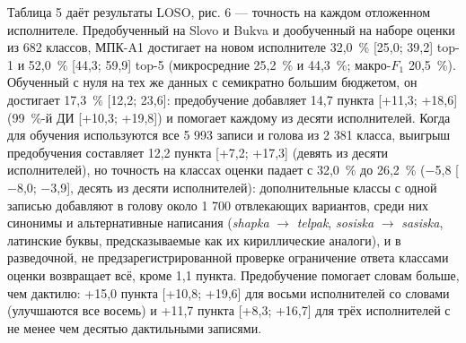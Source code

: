 \documentclass[a4paper,fleqn]{cas-dc}
\begin{document}
Таблица 5 даёт результаты LOSO, рис. 6 --- точность на каждом отложенном исполнителе. Предобученный на Slovo и Bukva и дообученный на наборе оценки из 682 классов, МПК-A1 достигает на новом исполнителе 32,0~\% {[}25,0; 39,2{]} top-1 и 52,0~\% {[}44,3; 59,9{]} top-5 (микросредние 25,2~\% и 44,3~\%; макро-\(F_1\) 20,5~\%). Обученный с нуля на тех же данных с семикратно большим бюджетом, он достигает 17,3~\% {[}12,2; 23,6{]}: предобучение добавляет 14,7 пункта {[}+11,3; +18,6{]} (99~\%-й ДИ {[}+10,3; +19,8{]}) и помогает каждому из десяти исполнителей. Когда для обучения используются все 5 993 записи и голова из 2 381 класса, выигрыш предобучения составляет 12,2 пункта {[}+7,2; +17,3{]} (девять из десяти исполнителей), но точность на классах оценки падает с 32,0~\% до 26,2~\% ($-$5,8 {[}$-$8,0; $-$3,9{]}, десять из десяти исполнителей): дополнительные классы с одной записью добавляют в голову около 1 700 отвлекающих вариантов, среди них синонимы и альтернативные написания (\emph{shapka} $\rightarrow$ \emph{telpak}, \emph{sosiska} $\rightarrow$ \emph{sasiska}, латинские буквы, предсказываемые как их кириллические аналоги), и в разведочной, не предзарегистрированной проверке ограничение ответа классами оценки возвращает всё, кроме 1,1 пункта. Предобучение помогает словам больше, чем дактилю: +15,0 пункта {[}+10,8; +19,6{]} для восьми исполнителей со словами (улучшаются все восемь) и +11,7 пункта {[}+8,3; +16,7{]} для трёх исполнителей с не менее чем десятью дактильными записями.
\end{document}
